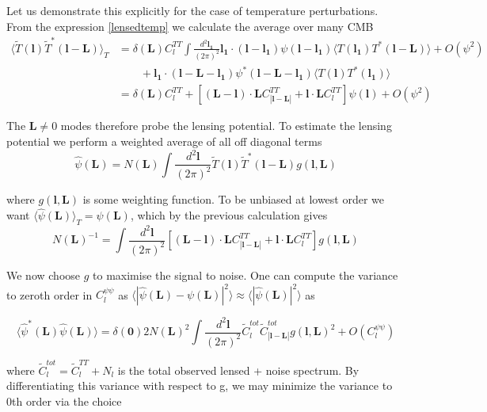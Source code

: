 \documentclass[a4paper,10pt]{article}
\renewcommand{\v}[1]{\mathbf{#1}}
\newcommand{\finttwo}[1]{\int \frac{d^2 \v{#1}}{(2\pi)^2}}
\begin{document}
Let us demonstrate this explicitly for the case of temperature perturbations. From the expression \ref{lensedtemp} we calculate the average over many CMB
\begin{equation}\begin{split}
\langle \tilde{T}(\v{l})\tilde{T}^*(\v{l}-\v{L})\rangle_{T} &= \delta(\v{L})C_l^{TT} \finttwo{l_1}  \v{l_1}\cdot(\v{l}-\v{l_1})\psi(\v{l}-\v{l_1}) \langle T(\v{l_1})T^*(\v{l}-\v{L})\rangle + O(\psi^2) \\
&\qquad + \v{l_1}\cdot(\v{l}-\v{L}-\v{l_1})\psi^*(\v{l}-\v{L}-\v{l_1}) \langle T(\v{l})T^*(\v{l_1})\rangle\\
&=\delta(\v{L})C_l^{TT} + [(\v{L}-\v{l})\cdot\v{L}C^{TT}_{|\v{l}-\v{L}|}+\v{l}\cdot\v{L}C_l^{TT}]\psi(\v{l}) + O(\psi^2)
\end{split}\end{equation}

The $\v{L}\neq 0 $ modes therefore probe the lensing potential. To estimate the lensing potential we perform a weighted average of all off diagonal terms
\begin{equation}
\hat{\psi}(\v{L}) = N(\v{L})\finttwo{l} \tilde{T}(\v{l})\tilde{T}^*(\v{l-L})g(\v{l},\v{L})
\end{equation}

where $g(\v{l},\v{L})$ is some weighting function. To be unbiased at lowest order we want $\langle \hat{\psi}(\v{L}) \rangle_T = \psi(\v{L})$, which by the previous calculation gives
\begin{equation}
N(\v{L})^{-1} = \finttwo{l} [(\v{L}-\v{l})\cdot\v{L}C^{TT}_{|\v{l}-\v{L}|}+\v{l}\cdot\v{L}C_l^{TT}]g(\v{l},\v{L})
\end{equation}

We now choose $g$ to maximise the signal to noise. One can compute the variance to zeroth order in $C_l^{\psi\psi}$ as $\langle| \hat{\psi}(\v{L})-\psi(\v{L})|^2 \rangle \approx 
\langle| \hat{\psi}(\v{L})|^2 \rangle$ as

\begin{equation}
\langle\hat{\psi}^*(\v{L}) \hat{\psi}(\v{L}) \rangle = \delta(\v{0})2N(\v{L})^2\finttwo{l}\tilde{C}_l^{tot}\tilde{C}_{|\v{l}-\v{L}|}^{tot}g(\v{l},\v{L})^2 + O(C_l^{\psi\psi})
\end{equation}

where $\tilde{C}_l^{tot} = \tilde{C}_l^{TT} + N_l$ is the total observed lensed + noise spectrum. By differentiating this variance with respect to g, we may minimize the variance to 0th order via the choice
\end{document}
